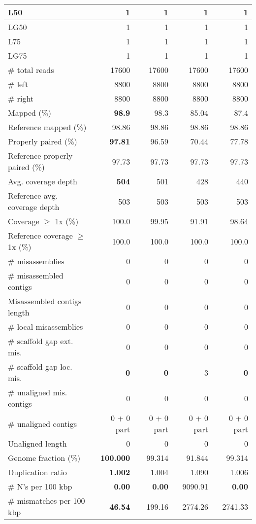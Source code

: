 \documentclass[12pt,a4paper]{article}
\begin{document}
\begin{table}[ht]
\begin{center}
\begin{tabular}{|l*{4}{|r}|}
L50 & 1 & 1 & 1 & 1 \\ \hline
LG50 & 1 & 1 & 1 & 1 \\ \hline
L75 & 1 & 1 & 1 & 1 \\ \hline
LG75 & 1 & 1 & 1 & 1 \\ \hline
\# total reads & 17600 & 17600 & 17600 & 17600 \\ \hline
\# left & 8800 & 8800 & 8800 & 8800 \\ \hline
\# right & 8800 & 8800 & 8800 & 8800 \\ \hline
Mapped (\%) & {\bf 98.9} & 98.3 & 85.04 & 87.4 \\ \hline
Reference mapped (\%) & 98.86 & 98.86 & 98.86 & 98.86 \\ \hline
Properly paired (\%) & {\bf 97.81} & 96.59 & 70.44 & 77.78 \\ \hline
Reference properly paired (\%) & 97.73 & 97.73 & 97.73 & 97.73 \\ \hline
Avg. coverage depth & {\bf 504} & 501 & 428 & 440 \\ \hline
Reference avg. coverage depth & 503 & 503 & 503 & 503 \\ \hline
Coverage $\geq$ 1x (\%) & 100.0 & 99.95 & 91.91 & 98.64 \\ \hline
Reference coverage $\geq$ 1x (\%) & 100.0 & 100.0 & 100.0 & 100.0 \\ \hline
\# misassemblies & 0 & 0 & 0 & 0 \\ \hline
\# misassembled contigs & 0 & 0 & 0 & 0 \\ \hline
Misassembled contigs length & 0 & 0 & 0 & 0 \\ \hline
\# local misassemblies & 0 & 0 & 0 & 0 \\ \hline
\# scaffold gap ext. mis. & 0 & 0 & 0 & 0 \\ \hline
\# scaffold gap loc. mis. & {\bf 0} & {\bf 0} & 3 & {\bf 0} \\ \hline
\# unaligned mis. contigs & 0 & 0 & 0 & 0 \\ \hline
\# unaligned contigs & 0 + 0 part & 0 + 0 part & 0 + 0 part & 0 + 0 part \\ \hline
Unaligned length & 0 & 0 & 0 & 0 \\ \hline
Genome fraction (\%) & {\bf 100.000} & 99.314 & 91.844 & 99.314 \\ \hline
Duplication ratio & {\bf 1.002} & 1.004 & 1.090 & 1.006 \\ \hline
\# N's per 100 kbp & {\bf 0.00} & {\bf 0.00} & 9090.91 & {\bf 0.00} \\ \hline
\# mismatches per 100 kbp & {\bf 46.54} & 199.16 & 2774.26 & 2741.33 \\ \hline

\end{tabular}
\end{center}
\end{table}
\end{document}
